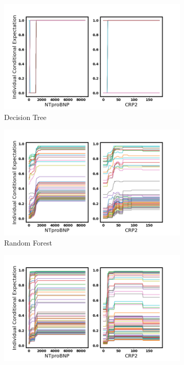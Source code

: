 \begin{figure}
\centering
\begin{subfigure}[b]{0.485\textwidth}
    \centering
    \includegraphics[width=\textwidth]{figures/chapter_interp/dt_ice_crp_ntproBNP.png}
    \caption{Decision Tree}
    \label{fig:dt_ice}
\end{subfigure}
\hfill
\begin{subfigure}[b]{0.485\textwidth}
    \centering
    \includegraphics[width=\textwidth]{figures/chapter_interp/rf_ice_crp_ntproBNP.png}
    \caption{Random Forest}
    \label{fig:rf_ice}
\end{subfigure}
\hfill
\begin{subfigure}[b]{0.485\textwidth}
    \centering
    \includegraphics[width=\textwidth]{figures/chapter_interp/xgbc_ice_crp_ntproBNP.png}

\end{subfigure}
\end{figure}
